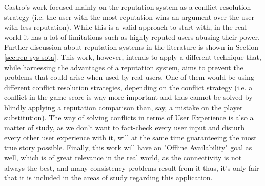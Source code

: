 Castro's work focused mainly on the reputation system as a conflict resolution strategy (i.e. the user with the most reputation wins an argument over the user with less reputation). While this is a valid approach to start with, in the real world it has a lot of limitations such as highly-reputed users abusing their power. Further discussion about reputation systems in the literature is shown in Section \ref{sec:rep-sys-sota}. This work, however, intends to apply a different technique that, while harnessing the advantages of a reputation system, aims to prevent the problems that could arise when used by real users. One of them would be using different conflict resolution strategies, depending on the conflict strategy (i.e. a conflict in the game score is way more important and thus cannot be solved by blindly applying a reputation comparison than, say, a mistake on the player substitution). The way of solving conflicts in terms of User Experience is also a matter of study, as we don't want to fact-check every user input and disturb every other user experience with it, will at the same time guaranteeing the most true story possible. Finally, this work will have an "Offline Availability" goal as well, which is of great relevance in the real world, as the connectivity is not always the best, and many consistency problems result from it thus, it's only fair that it is included in the areas of study regarding this application.